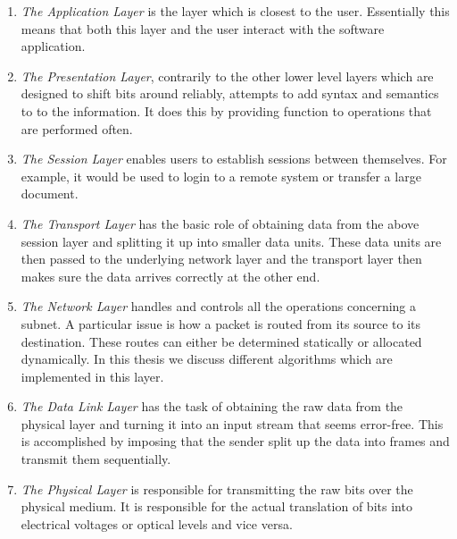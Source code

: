 \begin{enumerate}


 \item \textit{The Application Layer} is the layer which is closest to the user. Essentially this means that both this layer and the user interact with the software application.
 

 \item \textit{The Presentation Layer}, contrarily to the other lower level layers which are designed to shift bits around reliably, attempts to add syntax and semantics to to the information. It does this by providing function to operations that are performed often. 

 \item \textit{The Session Layer} enables users to establish sessions between themselves. For example, it would be used to login to a remote system or transfer a large document.
 
 \item \textit{The Transport Layer} has the basic role of obtaining data from the above session layer and splitting it up into smaller data units. These data units are then passed to the underlying network layer and the transport layer then makes sure the data arrives correctly at the other end.

 \item \textit{The Network Layer} handles and controls all the operations concerning a subnet. A particular issue is how a packet is routed from its source to its destination. These routes can either be determined statically or allocated dynamically. In this thesis we discuss different algorithms which are implemented in this layer.

 \item \textit{The Data Link Layer} has the task of obtaining the raw data from the physical layer and turning it into an input stream that seems error-free. This is accomplished by imposing that the sender split up the data into frames and transmit them sequentially. 


 \item \textit{The Physical Layer} is responsible for transmitting the raw bits over the physical medium. It is responsible for the actual translation of bits into electrical voltages or optical levels and vice versa.

\end{enumerate}


